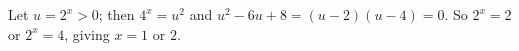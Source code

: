 Let $u=2^x>0$; then $4^x=u^2$ and $u^2-6u+8=(u-2)(u-4)=0$. So $2^x=2$ or $2^x=4$, giving $x=\boxed{1\text{ or }2}$.
